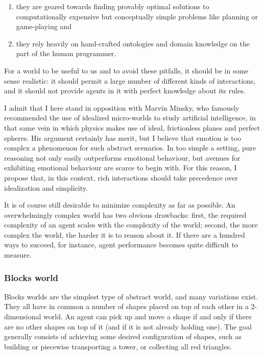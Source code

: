 \begin{enumerate}
	\item they are geared towards finding provably optimal solutions to computationally expensive but conceptually simple problems like planning or game-playing and
	\item they rely heavily on hand-crafted ontologies and domain knowledge on the part of the human programmer.
\end{enumerate}

For a world to be useful to us and to avoid these pitfalls, it should be in some sense realistic: it should permit a large number of different kinds of interactions, and it should not provide agents in it with perfect knowledge about its rules. 

I admit that I here stand in opposition with Marvin Minsky, who famously recommended the use of idealized micro-worlds to study artificial intelligence, in that same vein in which physics makes use of ideal, frictionless planes and perfect spheres. His argument certainly has merit, but I believe that emotion is too complex a phenomenon for such abstract scenarios. In too simple a setting, pure reasoning not only easily outperforms emotional behaviour, but avenues for exhibiting emotional behaviour are scarce to begin with. For this reason, I propose that, in this context, rich interactions should take precedence over idealization and simplicity.

It is of course still desirable to minimize complexity as far as possible. An overwhelmingly complex world has two obvious drawbacks: first, the required complexity of an agent scales with the complexity of the world; second, the more complex the world, the harder it is to reason about it. If there are a hundred ways to succeed, for instance, agent performance becomes quite difficult to measure.

\subsubsection{Blocks world}

Blocks worlds are the simplest type of abstract world, and many variations exist. They all have in common a number of shapes placed on top of each other in a 2-dimensional world. An agent can pick up and move a shape if and only if there are no other shapes on top of it (and if it is not already holding one). The goal generally consists of achieving some desired configuration of shapes, such as building or piecewise transporting a tower, or collecting all red triangles. 


